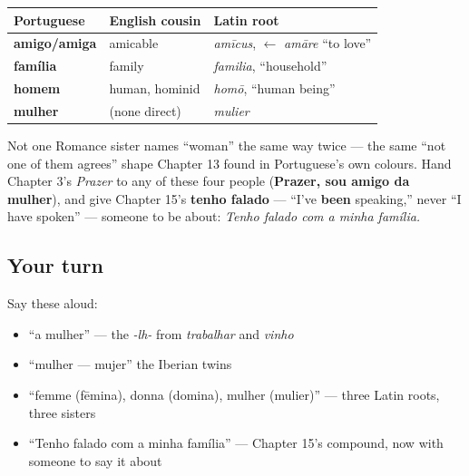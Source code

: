 \begin{grammarlens}[title={What you've built: The chapter in one table}]
\noindent
\begin{tabularx}{\linewidth}{@{}>{\raggedright\arraybackslash}X>{\raggedright\arraybackslash}X>{\raggedright\arraybackslash}X@{}}
\toprule
\textbf{Portuguese} & \textbf{English cousin} & \textbf{Latin root} \\
\midrule
\textbf{amigo/amiga} & amicable & \emph{amīcus}, $\leftarrow$ \emph{amāre} \textquotedblleft{}to love\textquotedblright{} \\
\textbf{família} & family & \emph{familia}, \textquotedblleft{}household\textquotedblright{} \\
\textbf{homem} & human, hominid & \emph{homō}, \textquotedblleft{}human being\textquotedblright{} \\
\textbf{mulher} & (none direct) & \emph{mulier} \\
\bottomrule
\end{tabularx}

Not one Romance sister names \textquotedblleft{}woman\textquotedblright{} the same way twice — the same \textquotedblleft{}not one of them agrees\textquotedblright{} shape Chapter 13 found in Portuguese's own colours. Hand Chapter 3's \emph{Prazer} to any of these four people (\textbf{Prazer, sou amigo da mulher}), and give Chapter 15's \textbf{tenho falado} — \textquotedblleft{}I've \textbf{been} speaking,\textquotedblright{} never \textquotedblleft{}I have spoken\textquotedblright{} — someone to be about: \emph{Tenho falado com a minha família.}
\end{grammarlens}

\subsection*{Your turn}
Say these aloud:

\begin{itemize}
\raggedright
  \item \textquotedblleft{}a mulher\textquotedblright{} — the \emph{-lh-} from \emph{trabalhar} and \emph{vinho}
  \item \textquotedblleft{}mulher — mujer\textquotedblright{} the Iberian twins
  \item \textquotedblleft{}femme (fēmina), donna (domina), mulher (mulier)\textquotedblright{} — three Latin roots, three sisters
  \item \textquotedblleft{}Tenho falado com a minha família\textquotedblright{} — Chapter 15's compound, now with someone to say it about
\end{itemize}

